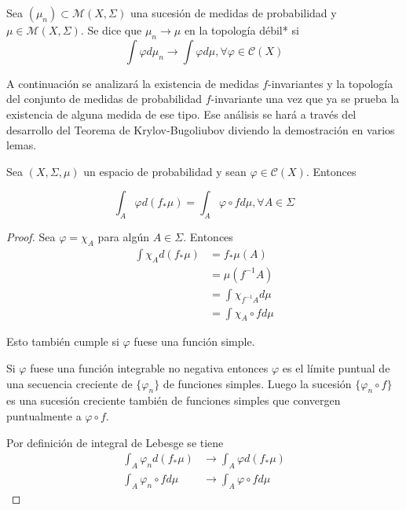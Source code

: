 \begin{definicion}
	Sea $(\mu_n) \subset \mathcal{M}(X,\Sigma)$ una sucesión de medidas de probabilidad y $\mu \in \mathcal{M}(X,\Sigma)$. Se dice que $\mu_n \rightarrow \mu$ en la topología débil* si
	\begin{equation}
		\int \varphi d\mu_n \rightarrow \int \varphi d\mu, \forall \varphi \in \mathcal{C}(X)
	\end{equation}
\end{definicion}

A continuación se analizará la existencia de medidas $f$-invariantes y la topología del conjunto de medidas de probabilidad $f$-invariante una vez que ya se prueba la existencia de alguna medida de ese tipo. Ese análisis se hará a través del desarrollo del Teorema de Krylov-Bugoliubov diviendo la demostración en varios lemas.

\begin{lema}\label{lema1_krylov-bugoliubov}
	Sea $(X,\Sigma,\mu)$ un espacio de probabilidad y sean $\varphi \in \mathcal{C}(X)$. Entonces
	
	\begin{equation}
		\int_A \varphi d(f_*\mu)=\int_A \varphi \circ f d\mu, \forall A \in \Sigma
	\end{equation}
\end{lema}

\begin{proof}
	Sea $\varphi = \chi_A$ para algún $A \in \Sigma$. Entonces
	\begin{align}
		\int \chi_A d(f_* \mu) &= f_* \mu(A)\\
		&= \mu(f^{-1} A)\\
		&= \int \chi_{f^{-1}A} d\mu\\
		&= \int \chi_A \circ f d\mu
	\end{align}
	
	Esto también cumple si $\varphi$ fuese una función simple.
	
	Si $\varphi$ fuese una función integrable no negativa entonces $\varphi$ es el límite puntual de una secuencia creciente de $\{ \varphi_n \}$ de funciones simples. Luego la sucesión $\{ \varphi_n \circ f \}$ es una sucesión creciente también de funciones simples que convergen puntualmente a $\varphi \circ f$.
	
	Por definición de integral de Lebesge se tiene
	\begin{align}
		\int_A \varphi_n d(f_* \mu) &\rightarrow \int_A \varphi d(f_* \mu)\\
		\int_A \varphi_n \circ f d\mu &\rightarrow \int_A \varphi \circ f d\mu
	\end{align}
\end{proof}

